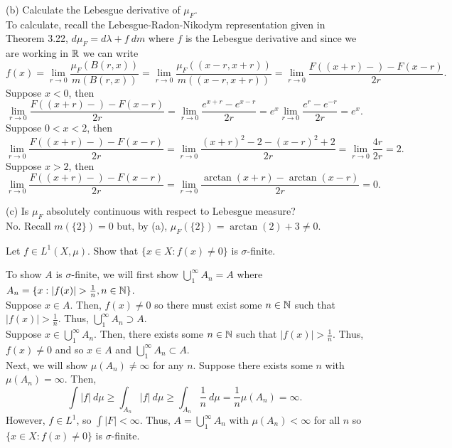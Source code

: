 \begin{list}
 (b) Calculate the Lebesgue derivative of $\mu_F$. \\
  To calculate, recall the Lebesgue-Radon-Nikodym representation given in Theorem 3.22, $d \mu_F = d \lambda + f \ dm$ where $f$ is the Lebesgue derivative and since we are working in ${\mathbb R}$ we can write
 \[
 f(x) = \lim_{r \rightarrow 0} \frac{\mu_F(B(r,x))}{m(B(r,x))} = \lim_{r \rightarrow 0}\frac{\mu_F((x-r,x+r))}{m((x-r,x+r))} = \lim_{r \rightarrow 0} \frac{F((x+r)-)-F(x-r)}{2r}.
 \]
 Suppose $x <0$, then\[
 \lim_{r \rightarrow 0} \frac{F((x+r)-)-F(x-r)}{2r} = \lim_{r \rightarrow 0} \frac{e^{x+r}-e^{x-r}}{2r}= e^x \lim_{r \rightarrow 0} \frac{e^{r}-e^{-r}}{2r}=e^x.
 \]
  Suppose $ 0 < x < 2$, then\[
 \lim_{r \rightarrow 0} \frac{F((x+r)-)-F(x-r)}{2r} = \lim_{r \rightarrow 0} \frac{(x+r)^2-2 - (x-r)^2 +2}{2r} =\lim_{r \rightarrow 0 } \frac{4r}{2r}=2.
 \]
   Suppose $ x>2$, then\[
 \lim_{r \rightarrow 0} \frac{F((x+r)-)-F(x-r)}{2r} = \lim_{r \rightarrow 0} \frac{\arctan(x+r)- \arctan(x-r) }{2r} =0.
 \]
  
 (c) Is $\mu_F$ absolutely continuous with respect to Lebesgue measure? \\
 No. Recall $m(\{ 2 \})=0$ but, by (a), $\mu_F(\{ 2 \}) = \arctan(2) + 3 \neq 0$. 
 \item Let $f \in L^1(X, \mu)$. Show that $\{x \in X: f(x) \neq 0 \}$ is $\sigma$-finite.
\begin{pf}
To show $A$ is $\sigma$-finite, we will first show $\bigcup_1^\infty A_n = A$ where $A_n = \{x : |f(x)|> \frac{1}{n}, n \in \N\}$.\\
Suppose $x \in A$. Then, $f(x) \neq 0$ so there must exist some $n \in {\mathbb N} $ such that $|f(x)| > \frac{1}{n}$. Thus, $\bigcup_1^\infty A_n \supset A$. \\
Suppose $x \in \bigcup_1^\infty A_n$. Then, there exists some $n \in {\mathbb N} $ such that $|f(x)| > \frac{1}{n}$. Thus, $f(x) \neq 0$ and so $x \in A$ and $\bigcup_1^\infty A_n \subset A$. \\
Next, we will show $\mu(A_n) \neq \infty$ for any $n$. Suppose there exists some $n$ with $\mu(A_n) = \infty$. Then, \[
\int |f| \ d\mu \geq \int_{A_n} |f| \ d\mu \geq \int_{A_n} \frac{1}{n} \ d\mu = \frac{1}{n} \mu(A_n) = \infty.
\]
However, $f \in L^1$, so $\int |F| < \infty$. Thus, $A = \bigcup_1^\infty A_n$ with $\mu(A_n)< \infty$ for all $n$ so $\{x \in X: f(x) \neq 0 \}$ is $\sigma$-finite.

\end{pf}


\end{list}
